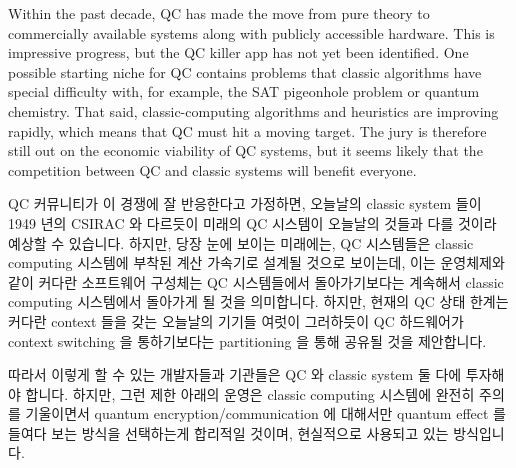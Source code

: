 Within the past decade, QC has made the move from pure theory to
commercially available systems along with publicly accessible hardware.
This is impressive progress, but the QC killer app has not yet been
identified.
One possible starting niche for QC contains problems that classic algorithms
have special difficulty with, for example, the SAT pigeonhole problem
or quantum chemistry.
That said, classic-computing algorithms and heuristics are improving
rapidly, which means that QC must hit a moving target.
The jury is therefore still out on the economic viability of QC systems,
but it seems likely that the competition between
QC and classic systems will benefit everyone.
\fi

QC 커뮤니티가 이 경쟁에 잘 반응한다고 가정하면, 오늘날의 classic system 들이
1949 년의 CSIRAC 와 다르듯이 미래의 QC 시스템이 오늘날의 것들과 다를 것이라
예상할 수 있습니다.
하지만, 당장 눈에 보이는 미래에는, QC 시스템들은 classic computing 시스템에
부착된 계산 가속기로 설계될 것으로 보이는데, 이는 운영체제와 같이 커다란
소프트웨어 구성체는 QC 시스템들에서 돌아가기보다는 계속해서 classic computing
시스템에서 돌아가게 될 것을 의미합니다.
하지만, 현재의 QC 상태 한계는 커다란 context 들을 갖는 오늘날의 기기들 여럿이
그러하듯이 QC 하드웨어가 context switching 을 통하기보다는 partitioning 을 통해
공유될 것을 제안합니다.

따라서 이렇게 할 수 있는 개발자들과 기관들은 QC 와 classic system 둘 다에
투자해야 합니다.
하지만, 그런 제한 아래의 운영은 classic computing 시스템에 완전히 주의를
기울이면서 quantum encryption/communication 에 대해서만 quantum effect 를
들여다 보는 방식을 선택하는게 합리적일 것이며, 현실적으로 사용되고 있는
방식입니다.

